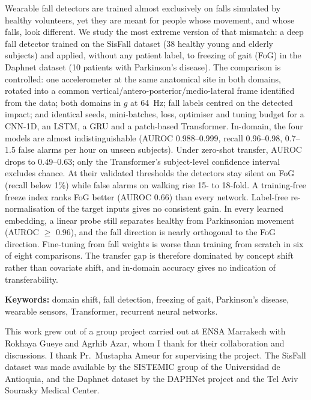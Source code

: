 \beforeabstract
{}

Wearable fall detectors are trained almost exclusively on falls simulated by healthy volunteers,
yet they are meant for people whose movement, and whose falls, look different. We study the most
extreme version of that mismatch: a deep fall detector trained on the SisFall dataset (38 healthy
young and elderly subjects) and applied, without any patient label, to freezing of gait (FoG) in the
Daphnet dataset (10 patients with Parkinson's disease). The comparison is controlled: one accelerometer at the same anatomical site in both domains, rotated
into a common vertical/antero-posterior/medio-lateral frame identified from the data; both domains in
$g$ at \SI{64}{\hertz}; fall labels centred on the detected impact; and identical seeds, mini-batches,
loss, optimiser and tuning budget for a CNN-1D, an LSTM, a GRU and a patch-based Transformer.
In-domain, the four models are almost indistinguishable (AUROC 0.988--0.999, recall 0.96--0.98,
0.7--1.5 false alarms per hour on unseen subjects). Under zero-shot transfer, AUROC drops to
0.49--0.63; only the Transformer's subject-level confidence interval excludes chance. At their validated
thresholds the detectors stay silent on FoG (recall below 1\%) while false alarms on walking rise 15- to
18-fold. A training-free freeze index ranks FoG better (AUROC 0.66) than every network. Label-free
re-normalisation of the target inputs gives no consistent gain. In every learned embedding, a linear
probe still separates healthy from Parkinsonian movement (AUROC $\geq$ 0.96), and the fall direction
is nearly orthogonal to the FoG direction. Fine-tuning from fall weights is worse than training from
scratch in six of eight comparisons. The transfer gap is therefore dominated by concept shift rather
than covariate shift, and in-domain accuracy gives no indication of transferability.

\textbf{Keywords:} domain shift, fall detection, freezing of gait, Parkinson's disease, wearable
sensors, Transformer, recurrent neural networks.


This work grew out of a group project carried out at ENSA Marrakech with Rokhaya Gueye and Agrhib
Azar, whom I thank for their collaboration and discussions.
I thank Pr.\ Mustapha Ameur for supervising the project. The SisFall dataset was made available by the
SISTEMIC group of the Universidad de Antioquia, and the Daphnet dataset by the DAPHNet project and the
Tel Aviv Sourasky Medical Center.

\afterpreface \afterabstract
